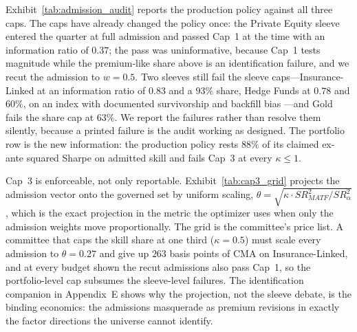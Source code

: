 \documentclass[pdftex,12pt,a4paper]{article}
\begin{document}
Exhibit~\ref{tab:admission_audit} reports the production policy against all three caps. The caps have already changed the policy once: the Private Equity sleeve entered the quarter at full admission and passed Cap~1 at the time with an information ratio of $0.37$; the pass was uninformative, because Cap~1 tests magnitude while the premium-like share above is an identification failure, and we recut the admission to $w=0.5$. Two sleeves still fail the sleeve caps---Insurance-Linked at an information ratio of $0.83$ and a $93\%$ share, Hedge Funds at $0.78$ and $60\%$, on an index with documented survivorship and backfill bias \citep{MalkielSaha2005}---and Gold fails the share cap at $63\%$. We report the failures rather than resolve them silently, because a printed failure is the audit working as designed. The portfolio row is the new information: the production policy rests $88\%$ of its claimed ex-ante squared Sharpe on admitted skill and fails Cap~3 at every $\kappa \le 1$.

Cap~3 is enforceable, not only reportable. Exhibit~\ref{tab:cap3_grid} projects the admission vector onto the governed set by uniform scaling, $\theta = \sqrt{\kappa \cdot SR^2_{MATF} / SR^2_{\alpha}}$, which is the exact projection in the metric the optimizer uses when only the admission weights move proportionally. The grid is the committee's price list. A committee that caps the skill share at one third ($\kappa = 0.5$) must scale every admission to $\theta = 0.27$ and give up $263$ basis points of CMA on Insurance-Linked, and at every budget shown the recut admissions also pass Cap~1, so the portfolio-level cap subsumes the sleeve-level failures. The identification companion in Appendix~E shows why the projection, not the sleeve debate, is the binding economics: the admissions masquerade as premium revisions in exactly the factor directions the universe cannot identify.
\end{document}
